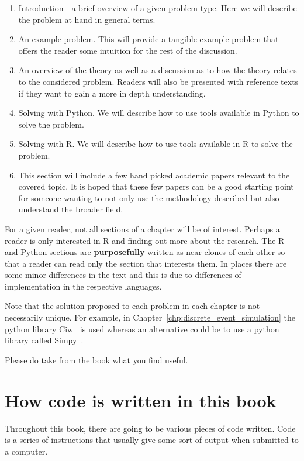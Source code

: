 \begin{enumerate}
\item
  Introduction - a brief overview of a given problem type. Here we will
  describe the problem at hand in general terms.
\item
  An example problem. This will provide a tangible example problem that
  offers the reader some intuition for the rest of the discussion.
\item
  An overview of the theory as well as a discussion as to how the theory relates
  to the considered problem. Readers will also be presented with reference
  texts if they want to gain a more in depth understanding.
\item
  Solving with Python. We will describe how to use tools available
  in Python to solve the problem.
\item
  Solving with R. We will describe how to use tools available
  in R to solve the problem.
\item
  This section will include a few hand picked academic papers relevant to the
  covered topic. It is hoped that these few papers can be a good starting point
  for someone wanting to not only use the methodology described but also
  understand the broader field.
\end{enumerate}

For a given reader, not all sections of a chapter will be of interest.
Perhaps a reader is only interested in R and finding out more about the
research.
The R and Python sections are \textbf{purposefully} written as near clones of
each other so that a reader can read only the section that interests them.
In places there are some minor differences in the text and this is due to
differences of implementation in the respective languages.

Note that the solution proposed to each problem in each chapter is not
necessarily unique. For example, in Chapter~\ref{chp:discrete_event_simulation}
the python library Ciw~\cite{ciwpython, palmer2019ciw}
is used whereas an alternative could be to use a python
library called Simpy~\cite{simpy}.

Please do take from the book what you find useful.

\section{How code is written in this book}\label{sec:how-code-is-written-in-this-book}

Throughout this book, there are going to be various pieces of code written. Code
is a series of instructions that usually give some sort of output when submitted
to a computer.

